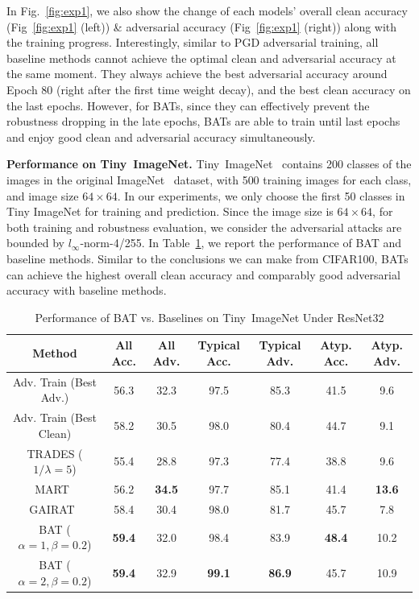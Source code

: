 In Fig.~\ref{fig:exp1}, we also show the change of each models' overall clean accuracy (Fig~\ref{fig:exp1} (left)) \& adversarial accuracy (Fig~\ref{fig:exp1} (right)) along with the training progress. 
Interestingly, similar to PGD adversarial training, all baseline methods cannot achieve the optimal clean and adversarial accuracy at the same moment.
They always achieve the best adversarial accuracy around Epoch 80 (right after the first time weight decay), and the best clean accuracy on the last epochs. However, for BATs, since they can effectively prevent the robustness dropping in the late epochs, BATs are able to train until last epochs and enjoy good clean and adversarial accuracy simultaneously.

\textbf{Performance on Tiny~ImageNet.} Tiny~ImageNet~\cite{le2015tiny} contains 200 classes of the images in the original ImageNet~\cite{krizhevsky2012imagenet} dataset, with 500 training images for each class, and image size $64\times 64$. In our experiments, we only choose the first 50 classes in Tiny ImageNet for training and prediction. Since the image size is $64\times 64$, for both training and robustness evaluation, we consider the adversarial attacks are bounded by $l_\infty$-norm-4/255. In Table~\ref{Tab:results_imagenet}, we report the performance of BAT and baseline methods. Similar to the conclusions we can make from CIFAR100, BATs can achieve the highest overall clean accuracy and comparably good adversarial accuracy with baseline methods. 
\begin{table}[h]
\small
\vspace{-0.2cm}
\centering
\caption{Performance of BAT vs. Baselines on Tiny~ImageNet Under ResNet32}
\begin{tabular}{c|cc|cc|cc}
\hline
Method & All Acc. & All Adv. & Typical Acc. & Typical Adv. & Atyp. Acc. & Atyp. Adv. \\
\hline
\hline
Adv. Train (Best Adv.) & 56.3 & 32.3 & 97.5 & 85.3 &41.5 & 9.6\\
Adv. Train (Best Clean) & 58.2 & 30.5 & 98.0 & 80.4 & 44.7 & 9.1 \\
TRADES ($1/\lambda = 5$) & 55.4 & 28.8 & 97.3 & 77.4 & 38.8 & 9.6 \\
MART~\cite{wang2019improving} & 56.2 & \textbf{34.5} & 97.7 & 85.1 & 41.4 & \textbf{13.6} \\
GAIRAT~\cite{zhang2020geometry} & 58.4 & 30.4 & 98.0 & 81.7 & 45.7 & 7.8\\
\hline
BAT ($\alpha = 1, \beta = 0.2$) & \textbf{59.4} &32.0 & 98.4 & 83.9 & \textbf{48.4} & 10.2 \\
BAT ($\alpha = 2, \beta = 0.2$) &\textbf{59.4} &32.9 & \textbf{99.1} & \textbf{86.9} & 45.7 & 10.9 \\
\hline
\hline
\end{tabular}
\label{Tab:results_imagenet}
\end{table}

